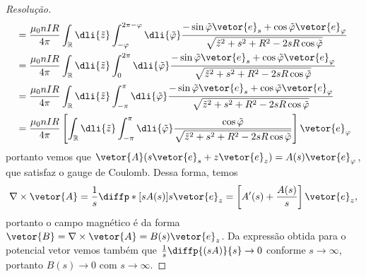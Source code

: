 \begin{proof}[Resolução]
\begin{align*}
                              &= \frac{\mu_0 n IR}{4\pi}\int_{\mathbb{R}} \dli{\tilde{z}} \int_{-\varphi}^{2\pi - \varphi}\dli{\tilde{\varphi}} \frac{-\sin\tilde\varphi \vetor{e}_s + \cos\tilde\varphi\vetor{e}_\varphi}{\sqrt{\tilde{z}^2 + s^2 + R^2 - 2 s R \cos\tilde{\varphi}}}\\
                              &= \frac{\mu_0 n IR}{4\pi}\int_{\mathbb{R}} \dli{\tilde{z}} \int_{0}^{2\pi}\dli{\tilde{\varphi}} \frac{-\sin\tilde\varphi \vetor{e}_s + \cos\tilde\varphi\vetor{e}_\varphi}{\sqrt{\tilde{z}^2 + s^2 + R^2 - 2 s R \cos\tilde{\varphi}}}\\
                              &= \frac{\mu_0 n IR}{4\pi}\int_{\mathbb{R}} \dli{\tilde{z}} \int_{-\pi}^{\pi}\dli{\tilde{\varphi}} \frac{-\sin\tilde\varphi \vetor{e}_s + \cos\tilde\varphi\vetor{e}_\varphi}{\sqrt{\tilde{z}^2 + s^2 + R^2 - 2 s R \cos\tilde{\varphi}}}\\
                              &= \frac{\mu_0 n IR}{4\pi}\left[\int_{\mathbb{R}} \dli{\tilde{z}} \int_{-\pi}^{\pi}\dli{\tilde{\varphi}} \frac{\cos\tilde\varphi}{\sqrt{\tilde{z}^2 + s^2 + R^2 - 2 s R \cos\tilde{\varphi}}}\right]\vetor{e}_\varphi
    \end{align*}
    portanto vemos que \(\vetor{A}(s \vetor{e}_s + z\vetor{e}_z) = A(s)\vetor{e}_\varphi\), que satisfaz o gauge de Coulomb. Dessa forma, temos
    \begin{equation*}
        \nabla\times \vetor{A} = \frac{1}{s} \diffp*{\left[s A(s)\right]}{s} \vetor{e}_z = \left[A'(s) + \frac{A(s)}{s}\right]\vetor{e}_z,
    \end{equation*}
    portanto o campo magnético é da forma \(\vetor{B} = \nabla\times \vetor{A} = B(s) \vetor{e}_z\). Da expressão obtida para o potencial vetor vemos também que \(\frac{1}{s}\diffp{(s A)}{s} \to 0\) conforme \(s \to \infty\), portanto \(B(s) \to 0\) com \(s \to \infty\).


\end{proof}

